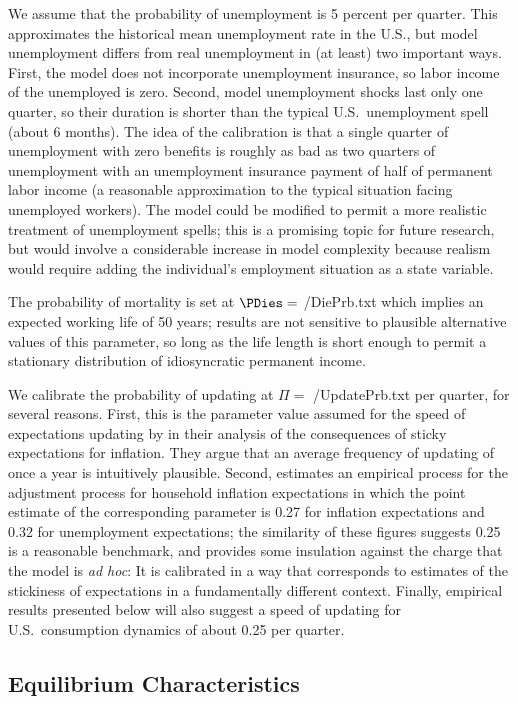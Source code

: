 \documentclass[titlepage]{\econtex}\newcommand{\texname}{cAndCwithStickyE}
\begin{document}
We assume that the probability of unemployment is 5 percent per quarter.  This approximates the historical mean unemployment rate in the U.S., but model unemployment differs from real unemployment in (at least) two important ways.  First, the model does not incorporate unemployment insurance, so labor income of the unemployed is zero.  Second, model unemployment shocks last only one quarter, so their duration is shorter than the typical U.S.\ unemployment spell (about 6 months).  The idea of the calibration is that a single quarter of unemployment with zero benefits is roughly as bad as two quarters of unemployment with an unemployment insurance payment of half of permanent labor income (a reasonable approximation to the typical situation facing unemployed workers).  The model could be modified to permit a more realistic treatment of unemployment spells; this is a promising topic for future research, but would involve a considerable increase in model complexity because realism would require adding the individual's employment situation as a state variable.

The probability of mortality is set at $\PDies=$  {\ParmDir/DiePrb.txt} which implies an expected working life of 50 years; results are not sensitive to plausible alternative values of this parameter, so long as the life length is short enough to permit a stationary distribution of idiosyncratic permanent income.

We calibrate the probability of updating at $\Pi=$  {\ParmDir/UpdatePrb.txt} per quarter, for several reasons.  First, this is the parameter value assumed for the speed of expectations updating by \cite{mrSlumps} in their analysis of the consequences of sticky expectations for inflation.  They argue that an average frequency of updating of once a year is intuitively plausible.  Second, \cite{carroll:epidemicinflQJE} estimates an empirical process for the adjustment process for household inflation expectations in which the point estimate of the corresponding parameter is 0.27 for inflation expectations and 0.32 for unemployment expectations; the similarity of these figures suggests 0.25 is a reasonable benchmark, and provides some insulation against the charge that the model is {\it ad hoc}: It is calibrated in a way that corresponds to estimates of the stickiness of expectations in a fundamentally different context.  Finally, empirical results presented below will also suggest a speed of updating for U.S.\ consumption dynamics of about 0.25 per quarter.


\subsection{Equilibrium Characteristics}
\end{document}

